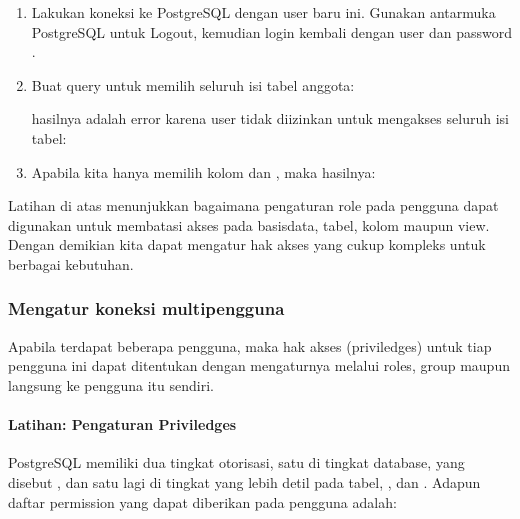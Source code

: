 \documentclass[letterpaper,10pt,english]{sphinxmanual}
\begin{document}
\begin{enumerate}
\item {} 
Lakukan koneksi ke PostgreSQL dengan user baru ini. Gunakan antarmuka PostgreSQL untuk Logout, kemudian login kembali dengan user  dan password .

\item {} 
Buat query untuk memilih seluruh isi tabel anggota:

\begin{sphinxVerbatim}[commandchars=\\\{\}]
    
\end{sphinxVerbatim}

hasilnya adalah error karena user  tidak diizinkan untuk mengakses seluruh isi tabel:


\item {} 
Apabila kita hanya memilih kolom  dan , maka hasilnya:


\end{enumerate}

Latihan di atas menunjukkan bagaimana pengaturan role pada pengguna dapat digunakan untuk membatasi akses pada basisdata, tabel, kolom maupun view. Dengan demikian kita dapat mengatur hak akses yang cukup kompleks untuk berbagai kebutuhan.


\subsubsection{Mengatur koneksi multi\sphinxhyphen{}pengguna}
\label{\detokenize{sesi2/dbmanagement:mengatur-koneksi-multi-pengguna}}
Apabila terdapat beberapa pengguna, maka hak akses (priviledges) untuk tiap pengguna ini dapat ditentukan dengan mengaturnya melalui roles, group maupun langsung ke pengguna itu sendiri.


\paragraph{Latihan: Pengaturan Priviledges}
\label{\detokenize{sesi2/dbmanagement:latihan-pengaturan-priviledges}}
PostgreSQL memiliki dua tingkat otorisasi, satu di tingkat database, yang disebut , dan satu lagi di tingkat yang lebih detil pada tabel, , dan .
Adapun daftar permission yang dapat diberikan pada pengguna adalah:
\end{document}
